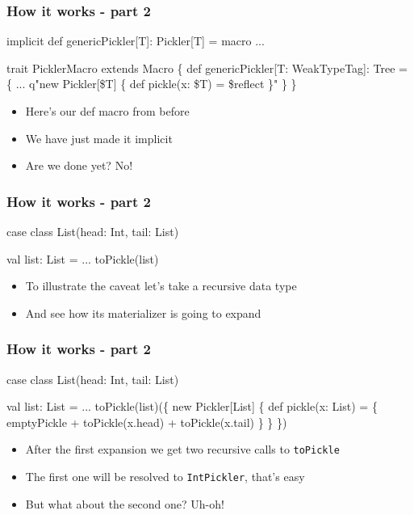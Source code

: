 \documentclass[svgnames,hyperref={bookmarks=false}]{beamer}
\begin{document}
\begin{frame}[fragile]
\frametitle{How it works - part 2}

\begin{semiverbatim}
\alert{implicit} def genericPickler[T]: Pickler[T] = macro ...

trait PicklerMacro extends Macro \{
  def genericPickler[T: WeakTypeTag]: Tree = \{
    ...
    q"new Pickler[\$T] \{ def pickle(x: \$T) = \$reflect \}"
  \}
\}

\end{semiverbatim}

\begin{itemize}
\item Here's our def macro from before
\item We have just made it implicit
\item Are we done yet? No!
\end{itemize}
\end{frame}

\begin{frame}[t, fragile]
\frametitle{How it works - part 2}

\begin{semiverbatim}
case class List(head: Int, tail: List)

val list: List = ...
toPickle(list)







\end{semiverbatim}

\begin{itemize}
\item To illustrate the caveat let's take a recursive data type
\item And see how its materializer is going to expand
\end{itemize}
\end{frame}

\begin{frame}[t, fragile]
\frametitle{How it works - part 2}

\begin{semiverbatim}
case class List(head: Int, tail: List)

val list: List = ...
toPickle(list)(\{
  new Pickler[List] \{
    def pickle(x: List) = \{
      emptyPickle +
      toPickle(x.head) +
      toPickle(x.tail)
    \}
  \}
\})
\end{semiverbatim}

\begin{itemize}
\item After the first expansion we get two recursive calls to \texttt{toPickle}
\item The first one will be resolved to \texttt{IntPickler}, that's easy
\item But what about the second one? \pause Uh-oh!
\end{itemize}
\end{frame}
\end{document}
